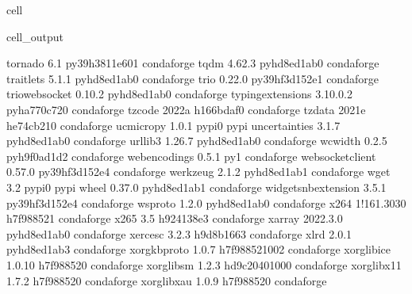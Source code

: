 \documentclass[letterpaper,table,10pt,english]{jupyterBook}
\begin{document}
\begin{sphinxuseclass}{cell}
\begin{sphinxVerbatimOutput}
\begin{sphinxuseclass}{cell_output}
\begin{sphinxVerbatim}[commandchars=\\\{\}]
tornado                   6.1              py39h3811e60\PYGZus{}1    conda\PYGZhy{}forge
tqdm                      4.62.3             pyhd8ed1ab\PYGZus{}0    conda\PYGZhy{}forge
traitlets                 5.1.1              pyhd8ed1ab\PYGZus{}0    conda\PYGZhy{}forge
trio                      0.22.0           py39hf3d152e\PYGZus{}1    conda\PYGZhy{}forge
trio\PYGZhy{}websocket            0.10.2             pyhd8ed1ab\PYGZus{}0    conda\PYGZhy{}forge
typing\PYGZus{}extensions         3.10.0.2           pyha770c72\PYGZus{}0    conda\PYGZhy{}forge
tzcode                    2022a                h166bdaf\PYGZus{}0    conda\PYGZhy{}forge
tzdata                    2021e                he74cb21\PYGZus{}0    conda\PYGZhy{}forge
uc\PYGZhy{}micro\PYGZhy{}py               1.0.1                    pypi\PYGZus{}0    pypi
uncertainties             3.1.7              pyhd8ed1ab\PYGZus{}0    conda\PYGZhy{}forge
urllib3                   1.26.7             pyhd8ed1ab\PYGZus{}0    conda\PYGZhy{}forge
wcwidth                   0.2.5              pyh9f0ad1d\PYGZus{}2    conda\PYGZhy{}forge
webencodings              0.5.1                      py\PYGZus{}1    conda\PYGZhy{}forge
websocket\PYGZhy{}client          0.57.0           py39hf3d152e\PYGZus{}4    conda\PYGZhy{}forge
werkzeug                  2.1.2              pyhd8ed1ab\PYGZus{}1    conda\PYGZhy{}forge
wget                      3.2                      pypi\PYGZus{}0    pypi
wheel                     0.37.0             pyhd8ed1ab\PYGZus{}1    conda\PYGZhy{}forge
widgetsnbextension        3.5.1            py39hf3d152e\PYGZus{}4    conda\PYGZhy{}forge
wsproto                   1.2.0              pyhd8ed1ab\PYGZus{}0    conda\PYGZhy{}forge
x264                      1!161.3030           h7f98852\PYGZus{}1    conda\PYGZhy{}forge
x265                      3.5                  h924138e\PYGZus{}3    conda\PYGZhy{}forge
xarray                    2022.3.0           pyhd8ed1ab\PYGZus{}0    conda\PYGZhy{}forge
xerces\PYGZhy{}c                  3.2.3                h9d8b166\PYGZus{}3    conda\PYGZhy{}forge
xlrd                      2.0.1              pyhd8ed1ab\PYGZus{}3    conda\PYGZhy{}forge
xorg\PYGZhy{}kbproto              1.0.7             h7f98852\PYGZus{}1002    conda\PYGZhy{}forge
xorg\PYGZhy{}libice               1.0.10               h7f98852\PYGZus{}0    conda\PYGZhy{}forge
xorg\PYGZhy{}libsm                1.2.3             hd9c2040\PYGZus{}1000    conda\PYGZhy{}forge
xorg\PYGZhy{}libx11               1.7.2                h7f98852\PYGZus{}0    conda\PYGZhy{}forge
xorg\PYGZhy{}libxau               1.0.9                h7f98852\PYGZus{}0    conda\PYGZhy{}forge

\end{sphinxVerbatim}
\end{sphinxuseclass}
\end{sphinxVerbatimOutput}
\end{sphinxuseclass}
\end{document}
